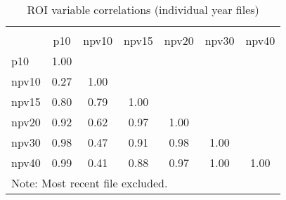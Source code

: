 \begin{table}[htbp]\centering
\caption{ROI variable correlations (individual year files)}
\begin{tabular}{l*{6}{c}}
\hline\hline
          &\multicolumn{6}{c}{}                                       \\
          &      p10&    npv10&    npv15&    npv20&    npv30&    npv40\\
\hline
p10       &     1.00&         &         &         &         &         \\
npv10     &     0.27&     1.00&         &         &         &         \\
npv15     &     0.80&     0.79&     1.00&         &         &         \\
npv20     &     0.92&     0.62&     0.97&     1.00&         &         \\
npv30     &     0.98&     0.47&     0.91&     0.98&     1.00&         \\
npv40     &     0.99&     0.41&     0.88&     0.97&     1.00&     1.00\\
\hline\hline
\multicolumn{7}{l}{\footnotesize Note: Most recent file excluded.}\\
\end{tabular}
\end{table}
